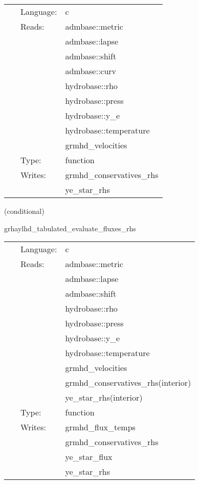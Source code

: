 \documentclass{article}
\begin{document}
 \begin{tabular*}{160mm}{cll} 
~ & Language:  & c \\ 
~ & Reads:  & admbase::metric \\ 
~& ~ &admbase::lapse\\ 
~& ~ &admbase::shift\\ 
~& ~ &admbase::curv\\ 
~& ~ &hydrobase::rho\\ 
~& ~ &hydrobase::press\\ 
~& ~ &hydrobase::y\_e\\ 
~& ~ &hydrobase::temperature\\ 
~& ~ &grmhd\_velocities\\ 
~ & Type:  & function \\ 
~ & Writes:  & grmhd\_conservatives\_rhs \\ 
~& ~ &ye\_star\_rhs\\ 
\end{tabular*} 


\vspace{5mm}

   (conditional) 

\hspace{5mm} grhaylhd\_tabulated\_evaluate\_fluxes\_rhs 

\hspace{5mm}{\it tabulated version of grhaylhd\_evaluate\_fluxes\_rhs } 


\hspace{5mm}

 \begin{tabular*}{160mm}{cll} 
~ & Language:  & c \\ 
~ & Reads:  & admbase::metric \\ 
~& ~ &admbase::lapse\\ 
~& ~ &admbase::shift\\ 
~& ~ &hydrobase::rho\\ 
~& ~ &hydrobase::press\\ 
~& ~ &hydrobase::y\_e\\ 
~& ~ &hydrobase::temperature\\ 
~& ~ &grmhd\_velocities\\ 
~& ~ &grmhd\_conservatives\_rhs(interior)\\ 
~& ~ &ye\_star\_rhs(interior)\\ 
~ & Type:  & function \\ 
~ & Writes:  & grmhd\_flux\_temps \\ 
~& ~ &grmhd\_conservatives\_rhs\\ 
~& ~ &ye\_star\_flux\\ 
~& ~ &ye\_star\_rhs\\ 
\end{tabular*} 
\end{document}
